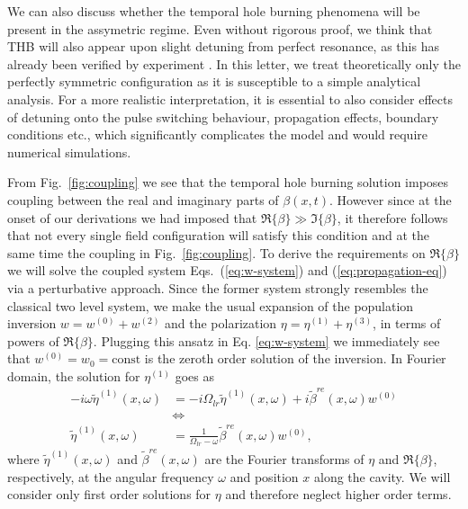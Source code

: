 \documentclass[onecolumn,secnumarabic,amssymb, nobibnotes, aip, prd]{revtex4-1}
\def\t{\tilde}
\def\om{\omega}
\begin{document}
We can also discuss whether the temporal hole burning phenomena will be present in the assymetric regime. Even without rigorous proof, we think that THB will also appear upon slight detuning from perfect resonance, as this has already been verified by experiment \cite{burghoff2015evaluating}. In this letter, we treat theoretically only the perfectly symmetric configuration as it is susceptible to a simple analytical analysis. For a more realistic interpretation, it is essential to also consider effects of detuning onto the pulse switching behaviour, propagation effects, boundary conditions etc., which significantly complicates the model and would require numerical simulations.


From Fig.~\ref{fig:coupling} we see that the temporal hole burning solution imposes coupling between the real and imaginary parts of $\beta(x,t)$. However since at the onset of our derivations we had imposed that $\Re\{\beta\} \gg \Im\{\beta\}$, it therefore follows that not every single field configuration will satisfy this condition and at the same time the coupling in Fig.~\ref{fig:coupling}. To derive the requirements on $\Re\{\beta\}$ we will solve the coupled system Eqs.~(\ref{eq:w-system}) and (\ref{eq:propagation-eq}) via a perturbative approach. Since the former system strongly resembles the classical two level system, we make the usual expansion of the population inversion $w=w^{(0)} + w^{(2)}$ and the polarization $\eta = \eta^{(1)} + \eta^{(3)}$, in terms of powers of $\Re\{\beta\}$. Plugging this ansatz in Eq. \ref{eq:w-system} we immediately see that $w^{(0)} = w_0 = \text{const}$ is the zeroth order solution of the inversion. In Fourier domain, the solution for $\eta^{(1)}$ goes as
\begin{align}
-i\om\t\eta^{(1)}(x,\om) &= -i\Omega_{lr}\t\eta^{(1)}(x,\om) +i\t\beta^{re}(x,\om)w^{(0)} \nonumber \\
	&\Leftrightarrow \nonumber \\
	\t\eta^{(1)}(x,\om) &= \frac{1}{\Omega_{lr}-\om}\t\beta^{re}(x,\om)w^{(0)}, \label{eq:eta-1-solution} 
\end{align}
where $\t\eta^{(1)}(x,\om) $ and $\tilde\beta^{re}(x,\om)$ are the Fourier transforms of $\eta$ and $\Re\{\beta\}$, respectively, at the angular frequency $\omega$ and position $x$ along the cavity. We will consider only first order solutions for $\eta$ and therefore neglect higher order terms. 
\end{document}
